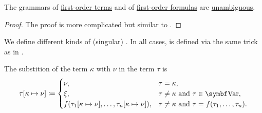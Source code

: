 \begin{proposition}\label{thm:propositional_formulas_are_unambiguous}
  The grammars of \hyperref[def:propositional_language/term]{first-order terms} and of \hyperref[def:propositional_language/formula]{first-order formulas} are \hyperref[def:grammar_derivation/ambiguity]{unambiguous}.
\end{proposition}
\begin{proof}
  The proof is more complicated but similar to .
\end{proof}

\begin{definition}\label{def:first_order_substition}
  We define different kinds of (singular) . In all cases,  is defined via the same trick as in .

  \begin{DefEnum}
     The substition of the term \( \kappa \) with \( \nu \) in the term \( \tau \) is
    \begin{equation}\label{eq:def:first_order_substition/term_in_term}
      \tau[\kappa \mapsto \nu] \coloneqq \begin{cases}
        \nu,                                                               &\tau = \kappa, \\
        \xi,                                                               &\tau \neq \kappa \Tand \tau \in \Bold{Var}, \\
        f(\tau_1[\kappa \mapsto \nu], \ldots, \tau_n[\kappa \mapsto \nu]), &\tau \neq \kappa \Tand \tau = f(\tau_1, \ldots, \tau_n).
      \end{cases}
    \end{equation}


\end{DefEnum}
\end{definition}
